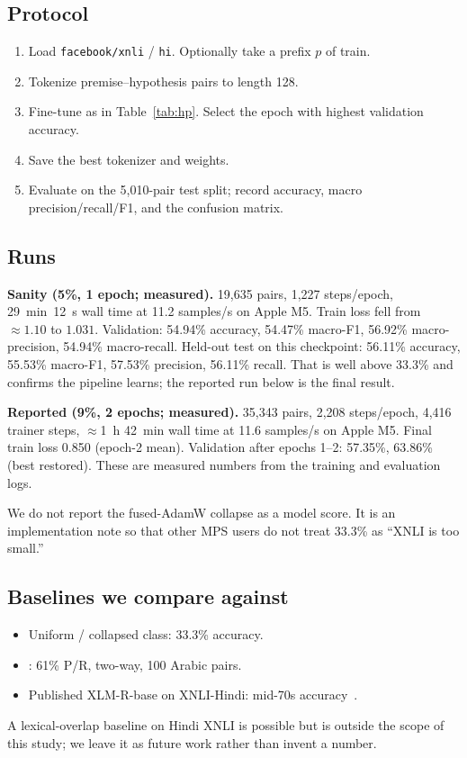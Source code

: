 \documentclass[conference]{IEEEtran}
\newcommand{\TrainWall}{1~h 42~min}
\newcommand{\TrainRate}{11.6 samples/s}
\newcommand{\TrainLoss}{0.850}
\newcommand{\EpOneAcc}{57.35\%}
\newcommand{\EpTwoAcc}{63.86\%}
\begin{document}
\subsection{Protocol}
\begin{enumerate}
  \item Load \texttt{facebook/xnli} / \texttt{hi}. Optionally take a prefix $p$ of train.
  \item Tokenize premise--hypothesis pairs to length 128.
  \item Fine-tune as in Table~\ref{tab:hp}. Select the epoch with highest validation accuracy.
  \item Save the best tokenizer and weights.
  \item Evaluate on the 5{,}010-pair test split; record accuracy, macro precision/recall/F1, and the confusion matrix.
\end{enumerate}

\subsection{Runs}
\textbf{Sanity (5\%, 1 epoch; measured).} 19{,}635 pairs, 1{,}227 steps/epoch, 29~min~12~s wall time at 11.2 samples/s on Apple M5. Train loss fell from $\approx 1.10$ to $1.031$. Validation: 54.94\% accuracy, 54.47\% macro-F1, 56.92\% macro-precision, 54.94\% macro-recall. Held-out test on this checkpoint: 56.11\% accuracy, 55.53\% macro-F1, 57.53\% precision, 56.11\% recall. That is well above 33.3\% and confirms the pipeline learns; the reported run below is the final result.

\textbf{Reported (9\%, 2 epochs; measured).} 35{,}343 pairs, 2{,}208 steps/epoch, 4{,}416 trainer steps, $\approx$\TrainWall{} wall time at \TrainRate{} on Apple M5. Final train loss \TrainLoss{} (epoch-2 mean). Validation after epochs 1--2: \EpOneAcc{}, \EpTwoAcc{} (best restored). These are measured numbers from the training and evaluation logs.

We do not report the fused-AdamW collapse as a model score. It is an implementation note so that other MPS users do not treat 33.3\% as ``XNLI is too small.''

\subsection{Baselines we compare against}
\begin{itemize}
  \item Uniform / collapsed class: 33.3\% accuracy.
  \item \citet{khader2016textual}: 61\% P/R, two-way, 100 Arabic pairs.
  \item Published XLM-R-base on XNLI-Hindi: mid-70s accuracy~\citep{conneau2020xlmr}.
\end{itemize}
A lexical-overlap baseline on Hindi XNLI is possible but is outside the scope of this study; we leave it as future work rather than invent a number.
\end{document}
